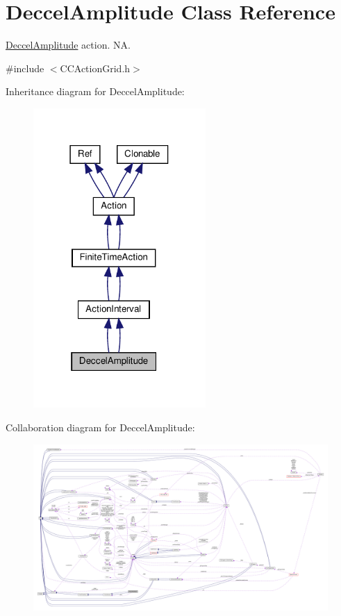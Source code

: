 \hypertarget{classDeccelAmplitude}{}\section{Deccel\+Amplitude Class Reference}
\label{classDeccelAmplitude}


\hyperlink{classDeccelAmplitude}{Deccel\+Amplitude} action.  NA.  




{\ttfamily \#include $<$C\+C\+Action\+Grid.\+h$>$}



Inheritance diagram for Deccel\+Amplitude\+:
\nopagebreak
\begin{figure}[H]
\begin{center}
\leavevmode
\includegraphics[width=186pt]{classDeccelAmplitude__inherit__graph}
\end{center}
\end{figure}


Collaboration diagram for Deccel\+Amplitude\+:
\nopagebreak
\begin{figure}[H]
\begin{center}
\leavevmode
\includegraphics[width=350pt]{classDeccelAmplitude__coll__graph}
\end{center}
\end{figure}
